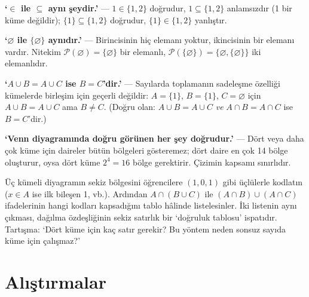 \begin{yanilgi}
\textbf{‘$\in$ ile $\subseteq$ aynı şeydir.’} — $1\in\{1,2\}$ doğrudur, $1\subseteq\{1,2\}$ anlamsızdır (1 bir küme değildir); $\{1\}\subseteq\{1,2\}$ doğrudur, $\{1\}\in\{1,2\}$ yanlıştır.

\smallskip
\textbf{‘$\varnothing$ ile $\{\varnothing\}$ aynıdır.’} — Birincisinin hiç elemanı yoktur, ikincisinin bir elemanı vardır. Nitekim $\mathcal P(\varnothing)=\{\varnothing\}$ bir elemanlı, $\mathcal P(\{\varnothing\})=\{\varnothing,\{\varnothing\}\}$ iki elemanlıdır.

\smallskip
\textbf{‘$A\cup B=A\cup C$ ise $B=C$’dir.’} — Sayılarda toplamanın sadeleşme özelliği kümelerde birleşim için geçerli değildir: $A=\{1\}$, $B=\{1\}$, $C=\varnothing$ için $A\cup B=A\cup C$ ama $B\neq C$. (Doğru olan: $A\cup B=A\cup C$ \emph{ve} $A\cap B=A\cap C$ ise $B=C$’dir.)

\smallskip
\textbf{‘Venn diyagramında doğru görünen her şey doğrudur.’} — Dört veya daha çok küme için daireler bütün bölgeleri gösteremez; dört daire en çok 14 bölge oluşturur, oysa dört küme $2^4=16$ bölge gerektirir. Çizimin kapsamı sınırlıdır.
\end{yanilgi}

\begin{sinif}
Üç kümeli diyagramın sekiz bölgesini öğrencilere $(1,0,1)$ gibi üçlülerle kodlatın ($x\in A$ ise ilk bileşen 1, vb.). Ardından $A\cap(B\cup C)$ ile $(A\cap B)\cup(A\cap C)$ ifadelerinin hangi kodları kapsadığını tablo hâlinde listelesinler. İki listenin aynı çıkması, dağılma özdeşliğinin sekiz satırlık bir ‘doğruluk tablosu’ ispatıdır. Tartışma: ‘Dört küme için kaç satır gerekir? Bu yöntem neden sonsuz sayıda küme için çalışmaz?’
\end{sinif}

\section*{Alıştırmalar}




